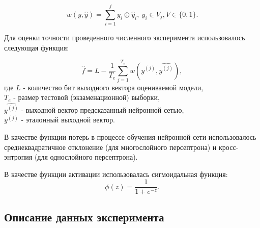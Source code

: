 \begin{equation}
w(y, \hat{y}) = \sum_{i=1}^{j} y_i \oplus \hat{y}_i,\ y_i \in V_j, V \in \{0,1\}.
\end{equation}
\bigskip

Для оценки точности проведенного численного эксперимента использовалось следующая функция:

\begin{equation}
\hat{f} =L - \dfrac{1}{T_e}\sum_{j=1}^{T_e}w(y^{(j)}, \hat{y^{(j)}}),
\end{equation}
где $L$ - количество бит выходного вектора оцениваемой модели,\\
$T_e$ - размер тестовой (экзаменационной) выборки,\\
$\hat{y^{(j)}}$ - выходной вектор предсказанный нейронной сетью,\\
$y^{(j)}$ - эталонный выходной вектор.

\bigskip
В качестве функции потерь в процессе обучения нейронной сети использовалось среднеквадратичное отклонение (для многослойного персептрона) и кросс-энтропия (для однослойного персептрона).

\bigskip
В качестве функции активации использовалась сигмоидальная функция:
\begin{equation}
\phi(z) = \frac{1}{1 + e ^{-z}}.
\end{equation}

\bigskip
\newpage
\subsection{Описание данных эксперимента}

